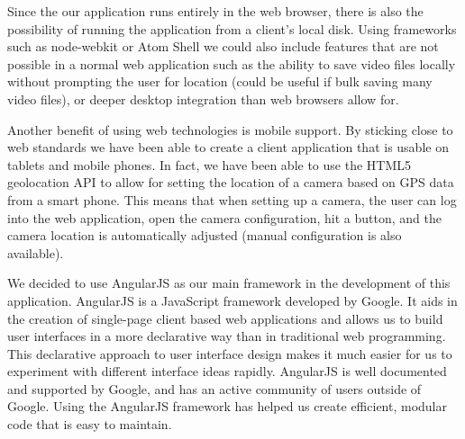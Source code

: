 Since the our application runs entirely in the web browser, there is also the
possibility of running the application from a client's local disk. Using
frameworks such as node-webkit\cite{nw_home} or Atom Shell\cite{atom_home} we
could also include features that are not possible in a normal web application
such as the ability to save video files locally without prompting the user for
location (could be useful if bulk saving many video files), or deeper desktop
integration than web browsers allow for.

Another benefit of using web technologies is mobile support. By sticking close
to web standards we have been able to create a client application that is usable
on tablets and mobile phones. In fact, we have been able to use the HTML5
geolocation API to allow for setting the location of a camera based on GPS data
from a smart phone. This means that when setting up a camera, the user can log
into the web application, open the camera configuration, hit a button, and the
camera location is automatically adjusted (manual configuration is also
available).

We decided to use AngularJS\cite{angular_home} as our main framework in the
development of this application. AngularJS is a JavaScript framework developed
by Google. It aids in the creation of single-page client based web applications
and allows us to build user interfaces in a more declarative way than in
traditional web programming. This declarative approach to user interface design
makes it much easier for us to experiment with different interface ideas
rapidly. AngularJS is well documented and supported by Google, and has an active
community of users outside of Google. Using the AngularJS framework has helped
us create efficient, modular code that is easy to maintain.

